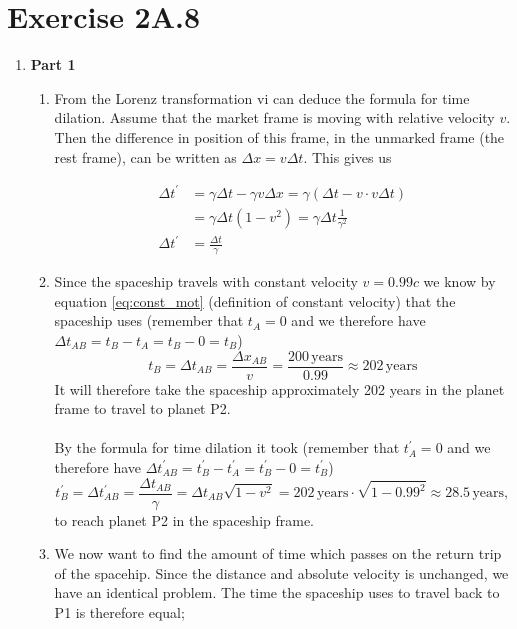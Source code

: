 \documentclass[a4paper,10pt,english]{article}
\begin{document}
\section*{Exercise 2A.8}


\begin{enumerate}

\item \textbf{Part 1}
\begin{enumerate}

\item From the Lorenz transformation vi can deduce the formula for time dilation. Assume that the market frame is moving with relative velocity $v$. Then the difference in position of this frame, in the unmarked frame (the rest frame), can be written as $\Delta x=v\Delta t$. This gives us

\begin{align*}
\Delta t^{\prime}&=\gamma \Delta t-\gamma v\Delta x=\gamma\left(\Delta t-v\cdot v\Delta t\right)\\
&=\gamma\Delta t\left(1-v^{2}\right)=\gamma\Delta t\frac{1}{\gamma^{2}}\\
\Delta t^{\prime}&=\frac{\Delta t}{\gamma}
\end{align*}

\item Since the spaceship travels with constant velocity $v=0.99c$ we know by equation \ref{eq:const_mot} (definition of constant velocity) that the spaceship uses (remember that $t_{A}=0$ and we therefore have $\Delta t_{AB}=t_{B}-t_{A}=t_{B}-0=t_{B}$) \[t_{B}=\Delta t_{AB}=\frac{\Delta x_{AB}}{v}=\frac{200\,\text{years}}{0.99}\approx202\,\text{years}\] It will therefore take the spaceship approximately 202 years in the planet frame to travel to planet P2.
\\
\\ 
By the formula for time dilation it took (remember that $t^{\prime}_{A}=0$ and we therefore have $\Delta t^{\prime}_{AB}=t^{\prime}_{B}-t^{\prime}_{A}=t^{\prime}_{B}-0=t^{\prime}_{B}$) \[t^{\prime}_{B}=\Delta t^{\prime}_{AB}=\dfrac{\Delta t_{AB}}{\gamma}=\Delta t_{AB}\sqrt{1-v^2}=202\,\text{years}\cdot\sqrt{1-0.99^2}\approx28.5\,\text{years},\] to reach planet P2 in the spaceship frame.

\item We now want to find the amount of time which passes on the return trip of the spacehip. Since the distance and absolute velocity is unchanged, we have an identical problem. The time the spaceship uses to travel back to P1 is therefore equal; 


\end{enumerate}
\end{enumerate}
\end{document}

